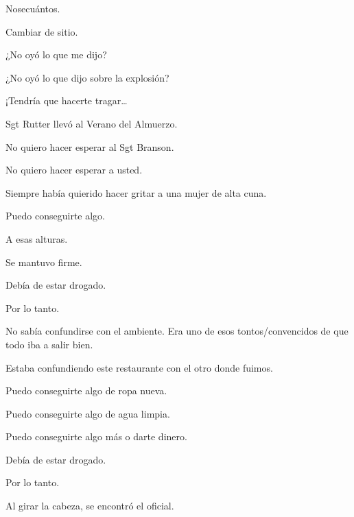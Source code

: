 \sk
Nosecuántos. 

\sk
Cambiar de sitio. 

\sk
¿No oyó lo que me dijo? 

\sk
¿No oyó lo que dijo sobre la explosión? 

\sk
¡Tendría que hacerte tragar\ldots{} 

\sk
Sgt Rutter llevó al Verano del Almuerzo. 

\sk
No quiero hacer esperar al Sgt Branson. 

\sk
No quiero hacer esperar a usted. \nb{}

\sk
Siempre había quierido hacer gritar a una mujer de alta cuna. 

\sk
Puedo conseguirte algo. 

\sk
A esas alturas. 

\sk
Se mantuvo firme. 

\sk
Debía de estar drogado. 

\sk
Por lo tanto. 

\sk
No sabía confundirse con el ambiente. Era uno de esos tontos/convencidos de que todo iba a salir bien. 

\sk
Estaba confundiendo este restaurante con el otro donde fuimos. 

\sk
Puedo conseguirte algo de ropa nueva. 

\sk
Puedo conseguirte algo de agua limpia. 

\sk
Puedo conseguirte algo más o darte dinero. 

\sk
Debía de estar drogado. 

\sk
Por lo tanto. 

\sk
Al girar la cabeza, se encontró el oficial. \nb{}

